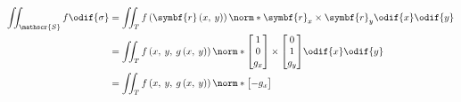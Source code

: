 \documentclass{article}
\begin{document}
\begin{align*}
    \iint_{\mathscr{S}} f \odif{\sigma} & = \iint_{T} f\left( \symbf{r}\left( x,\: y \right) \right) \norm*{\symbf{r}_x \times \symbf{r}_y} \odif{x} \odif{y} \\
                                        & = \iint_{T} f\left( x,\: y,\: g\left( x,\: y \right) \right) \norm*{
                                                                                                           \begin{bmatrix}
                                                                                                               1 \\
                                                                                                               0 \\
                                                                                                               g_x
                                                                                                           \end{bmatrix}
                                                                                                           \times
                                                                                                           \begin{bmatrix}
                                                                                                               0 \\
                                                                                                               1 \\
                                                                                                               g_y
                                                                                                           \end{bmatrix}
                                                                                                       } \odif{x} \odif{y}                                 \\
                                        & = \iint_{T} f\left( x,\: y,\: g\left( x,\: y \right) \right) \norm*{
                                                                                                           \begin{bmatrix}
                                                                                                               -g_x \\

\end{bmatrix}}
\end{align*}
\end{document}
